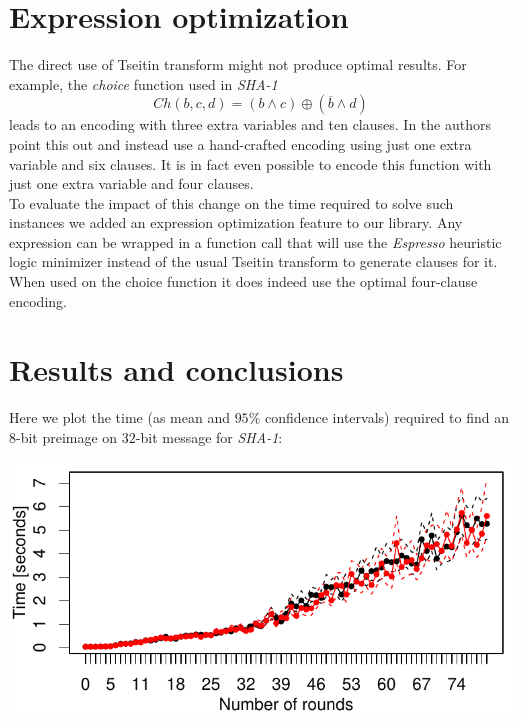\documentclass[myposter,portrait]{sciposter}
\def\mysection#1{
{\color{sectionCol}\section*{\sc\bfseries #1}}}
\begin{document}
\begin{multicols*}{3}
\columnbreak
\mysection{Expression optimization}
The direct use of Tseitin transform might not produce optimal results.
For example, the \emph{choice} function used in \emph{SHA-1}
\[
Ch(b, c, d) = (b \land c) \oplus (\overline{b} \land d)
\]
leads to an encoding with three extra variables and ten clauses.
In \cite{nossum2012sat} the authors point this out and instead use a hand-crafted encoding using just one extra variable and six clauses.
It is in fact even possible to encode this function with just one extra variable and four clauses.
~\\

To evaluate the impact of this change on the time required to solve such instances we added an expression optimization feature to our library.
Any expression can be wrapped in a function call that will use the \emph{Espresso} heuristic logic minimizer instead of the usual Tseitin transform to generate clauses for it.
When used on the choice function it does indeed use the optimal four-clause encoding.
%
%
%

\mysection{Results and conclusions}
Here we plot the time (as mean and $95\%$ confidence intervals) required to find an $8$-bit preimage on $32$-bit message for \emph{SHA-1}:

\includegraphics[width=\columnwidth]{figures/opt-sha1/sha1-32bit-8bitref-cmp-espresso-sq-lin.pdf}


\end{multicols*}
\end{document}
